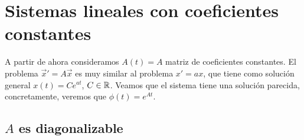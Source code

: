 \section{Sistemas lineales con coeficientes constantes}

A partir de ahora consideramos $\displaystyle A\left(t\right)=A $ matriz de coeficientes constantes.
El problema $\displaystyle \vec{x}'=A\vec{x} $ es muy similar al problema $\displaystyle x' = ax $, que tiene como solución general $\displaystyle x\left(t\right)=Ce^{at} $, $\displaystyle C \in \mathbb{R} $. Veamos que el sistema tiene una solución parecida, concretamente, veremos que $\displaystyle \phi\left(t\right)=e^{At} $. 
\subsection{$A$ es diagonalizable}

